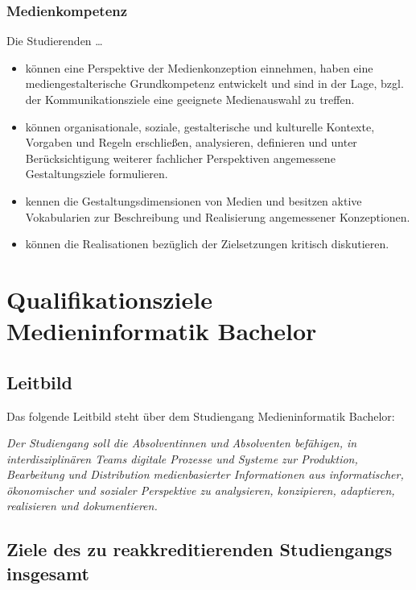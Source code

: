 \subsection{Medienkompetenz}\label{medienkompetenz}

Die Studierenden \ldots{}

\begin{itemize}
\tightlist
\item
  können eine Perspektive der Medienkonzeption einnehmen, haben eine
  mediengestalterische Grundkompetenz entwickelt und sind in der Lage,
  bzgl. der Kommunikationsziele eine geeignete Medienauswahl zu treffen.
\item
  können organisationale, soziale, gestalterische und kulturelle
  Kontexte, Vorgaben und Regeln erschließen, analysieren, definieren und
  unter Berücksichtigung weiterer fachlicher Perspektiven angemessene
  Gestaltungsziele formulieren.
\item
  kennen die Gestaltungsdimensionen von Medien und besitzen aktive
  Vokabularien zur Beschreibung und Realisierung angemessener
  Konzeptionen.
\item
  können die Realisationen bezüglich der Zielsetzungen kritisch
  diskutieren.
\end{itemize}

\chapter{Qualifikationsziele Medieninformatik
Bachelor}\label{qualifikationsziele-medieninformatik-bachelor}

\section{Leitbild}\label{leitbild}

Das folgende Leitbild steht über dem Studiengang Medieninformatik
Bachelor:

\emph{Der Studiengang soll die Absolventinnen und Absolventen befähigen,
in interdisziplinären Teams digitale Prozesse und Systeme zur
Produktion, Bearbeitung und Distribution medienbasierter Informationen
aus informatischer, ökonomischer und sozialer Perspektive zu
analysieren, konzipieren, adaptieren, realisieren und dokumentieren.}

\section{Ziele des zu reakkreditierenden Studiengangs
insgesamt}\label{ziele-des-zu-reakkreditierenden-studiengangs-insgesamt}


